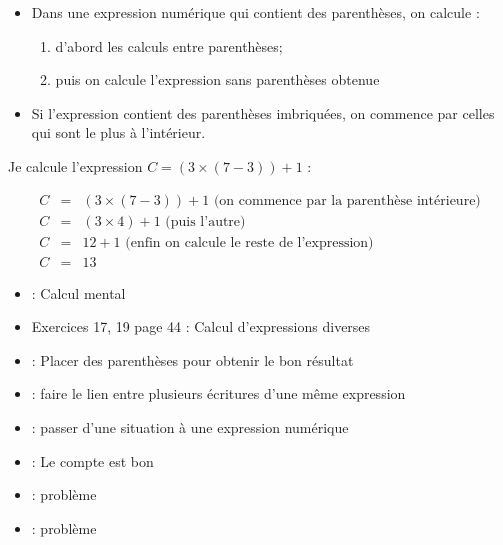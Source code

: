 \documentclass[12pt,a4paper]{article}
\begin{document}
\begin{myprop}
	\begin{itemize}
		\item Dans une expression numérique qui contient des parenthèses, on calcule :
		\begin{enumerate}
			\item d'abord les calculs entre parenthèses;
			\item puis on calcule l'expression sans parenthèses obtenue
		\end{enumerate}
	
		\item Si l'expression contient des parenthèses imbriquées, on commence par celles qui sont le plus à l'intérieur.
	\end{itemize}
	
	
\end{myprop}

\begin{myex}
	Je calcule l'expression $C = (3 \times (7 - 3))  + 1$ :
	
	\vspace*{-0.5cm}
	
	\begin{eqnarray*}
		C & = & (3 \times (7-3))  + 1 \text{ (on commence par la parenthèse intérieure)} \\
		C & = & (3 \times 4)+ 1 \text{ (puis l'autre)} \\
		C & = & 12  + 1 \text{ (enfin on calcule le reste de l'expression)}\\
		C & = & 13
	\end{eqnarray*}
\end{myex}

\begin{myexos}
	\begin{itemize}
		\item {} : Calcul mental
		\item Exercices 17, 19 page 44 : Calcul d'expressions diverses
		\item {} : Placer des parenthèses pour obtenir le bon résultat  
		\item {} : faire le lien entre plusieurs écritures d'une même expression 
		\item {} : passer d'une situation à une expression numérique
		\item {} : Le compte est bon
		\item {} : problème
		\item {} : problème
	\end{itemize}
\end{myexos}
\end{document}
